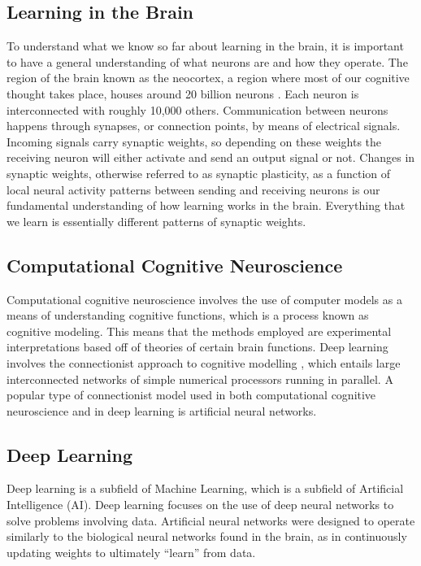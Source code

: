 \documentclass[12pt]{article}
\begin{document}
\subsection{Learning in the Brain}
To understand what we know so far about learning in the brain, it is important to have a general understanding of what neurons are and how they operate. The region of the brain known as the neocortex, a region where most of our cognitive thought takes place, houses around 20 billion neurons \cite{c3}. Each neuron is interconnected with roughly 10,000 others. Communication between neurons happens through synapses, or connection points, by means of electrical signals. Incoming signals carry synaptic weights, so depending on these weights the receiving neuron will either activate and send an output signal or not. Changes in synaptic weights, otherwise referred to as synaptic plasticity, as a function of local neural activity patterns between sending and receiving neurons is our fundamental understanding of how learning works in the brain. Everything that we learn is essentially different patterns of synaptic weights.

\subsection{Computational Cognitive Neuroscience}
Computational cognitive neuroscience involves the use of computer models as a means of understanding cognitive functions, which is a process known as cognitive modeling. This means that the methods employed are experimental interpretations based off of theories of certain brain functions. Deep learning involves the connectionist approach to cognitive modelling \cite{c5}, which entails large interconnected networks of simple numerical processors running in parallel. A popular type of connectionist model used in both computational cognitive neuroscience and in deep learning is artificial neural networks.

\subsection{Deep Learning}
Deep learning is a subfield of Machine Learning, which is a subfield of Artificial Intelligence (AI). Deep learning focuses on the use of deep neural networks to solve problems involving data. Artificial neural networks were designed to operate similarly to the biological neural networks found in the brain, as in continuously updating weights to ultimately “learn” from data. 
\end{document}
